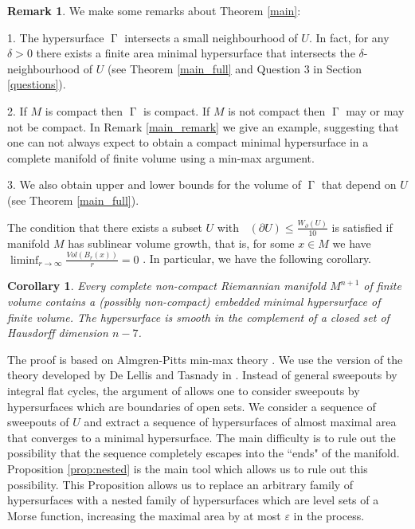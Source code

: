 \documentclass[12pt]{amsart}
\newtheorem{corollary}[theorem]{Corollary}
\DeclareMathOperator{\Hn}{\mathcal{H}^n}
\DeclareMathOperator{\G}{\Gamma}
\theoremstyle{definition}
\newtheorem{remark}[theorem]{Remark}
\begin{document}
\begin{remark}
We make some remarks about Theorem \ref*{main}:

1. The hypersurface $\G$ intersects a small neighbourhood of $U$.
In fact, for any $\delta>0$ there exists a finite area minimal hypersurface
that intersects the $\delta$-neighbourhood of $U$ (see Theorem \ref*{main_full}
and Question 3 in Section \ref*{questions}).

2. If $M$ is compact then $\G$ is compact. If $M$ is not compact
then $\G$ may or may not be compact.
In Remark \ref*{main_remark} we give an example,
suggesting that one can not always expect 
to obtain a compact minimal hypersurface
in a complete manifold of finite volume
using a min-max argument.

3. We also obtain upper and lower bounds for the volume
of $\G$ that depend on $U$ (see Theorem \ref*{main_full}).
\end{remark}


The condition that there exists a subset $U$ with
$\Hn(\partial U)\leq \frac{W_{\partial}(U)}{10}$ is 
satisfied if manifold $M$ has sublinear volume growth,
that is,
for some $x \in M$ we have $\liminf_{r \rightarrow \infty} \frac{Vol(B_r(x))}{r} =0 $ .
In particular, we have the following corollary.

\begin{corollary} \label{main'}
Every complete non-compact
Riemannian manifold $M^{n+1}$ of finite volume
contains a (possibly non-compact)
embedded minimal hypersurface of finite 
volume. The hypersurface is smooth
in the complement of a closed set of Hausdorff dimension $n-7$.
\end{corollary}

The proof is based on Almgren-Pitts min-max theory
\cite{Pi}.
We use the version of the theory developed by
De Lellis and Tasnady in \cite{DT}.
Instead of general sweepouts by integral flat cycles, the argument of \cite{DT} allows one to consider
sweepouts by hypersurfaces which are boundaries of open sets.
We consider a sequence of sweepouts of $U$ and extract a sequence
of hypersurfaces of almost maximal area that converges to a minimal hypersurface.
The main difficulty is to rule out the possibility that the sequence
completely escapes into the ``ends" of the manifold.
Proposition \ref*{prop:nested} is the main tool which allows us to rule out this possibility.
This Proposition allows us to replace an arbitrary family of hypersurfaces
with a nested family of hypersurfaces which are level sets of a Morse function,
increasing the maximal area by at most $\varepsilon$ in the process.
\end{document}
